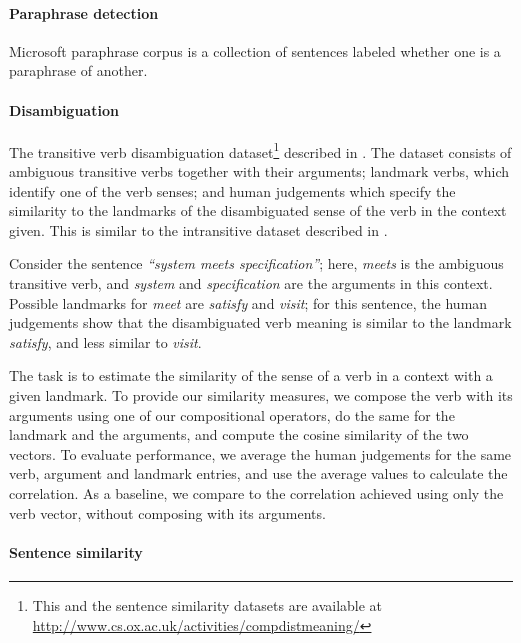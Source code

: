 \paragraph{Paraphrase detection}
\label{sec:paraphrase}

Microsoft paraphrase corpus \cite{dolan2005microsoft} is a collection of
sentences labeled whether one is a paraphrase of another.

\paragraph{Disambiguation}
\label{sec:disamb}

The transitive verb disambiguation dataset\footnote{This and the sentence
  similarity datasets are available at
  \url{http://www.cs.ox.ac.uk/activities/compdistmeaning/}} described in
\cite{grefenstette2011gems}. The dataset consists of ambiguous transitive verbs
together with their arguments; landmark verbs, which identify one of the verb
senses; and human judgements which specify the similarity to the landmarks of
the disambiguated sense of the verb in the context given. This is similar to the
intransitive dataset described in \cite{mitchell2008vector}.

Consider the sentence \textit{``system meets specification''}; here,
\textit{meets} is the ambiguous transitive verb, and \textit{system}
and \textit{specification} are the arguments in this context. Possible
landmarks for \emph{meet} are \textit{satisfy} and \textit{visit}; for
this sentence, the human judgements show that the disambiguated verb
meaning is similar to the landmark \textit{satisfy}, and less similar
to \textit{visit}.

The task is to estimate the similarity of the sense of a verb in a context with
a given landmark. To provide our similarity measures, we compose the verb with
its arguments using one of our compositional operators, do the same for the
landmark and the arguments, and compute the cosine similarity of the two
vectors. To evaluate performance, we average the human judgements for the same
verb, argument and landmark entries, and use the average values to calculate the
correlation. As a baseline, we compare to the correlation achieved using only
the verb vector, without composing with its arguments.

\paragraph{Sentence similarity}
\label{sec:sentence-similarity}

